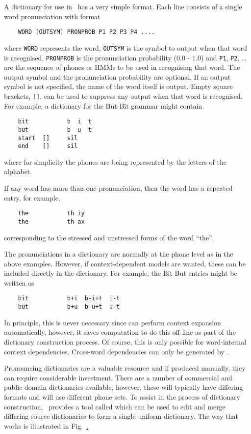A dictionary for use in \HTK\ has a very simple format.
Each line consists of a single word pronunciation with format
\begin{verbatim}
    WORD [OUTSYM] PRONPROB P1 P2 P3 P4 ....
\end{verbatim}
where \texttt{WORD} represents the word, \texttt{OUTSYM} is the symbol to
output when that word is recognised, \texttt{PRONPROB} is the pronunciation
probability ($0.0$ - $1.0$) and \texttt{P1}, \texttt{P2}, \ldots are the
sequence of phones or HMMs to be used in recognising that word. The output
symbol and the pronunciation probability are optional. If an output symbol is
not specified, the name of the word itself is output. Empty square brackets,
\texttt{[]}, can be used to suppress any output when that word is recognised.
For example, a dictionary for the But-Bit grammar might contain
\begin{verbatim}
    bit           b  i  t 
    but           b  u  t
    start  []     sil
    end    []     sil
\end{verbatim}
where for simplicity the phones are being represented by the letters of the alphabet.

If any word has more than one pronunciation, then the word
has a repeated entry, for example,
\begin{verbatim}
    the           th iy
    the           th ax 
\end{verbatim}
corresponding to the stressed and unstressed forms of the word
``the''.

The pronunciations in a dictionary are normally at the phone
level as in the above examples.  However, if context-dependent
models are wanted, these can be included directly in the dictionary.
For example, the Bit-But entries might be written as
\begin{verbatim}
    bit           b+i  b-i+t  i-t 
    but           b+u  b-u+t  u-t
\end{verbatim}
In principle, this is never necessary since  can perform context
expansion automatically, however, it saves computation to do this
off-line as part of the dictionary construction process.  Of course,
this is only possible for word-internal context dependencies.
Cross-word dependencies can only be generated by .


Pronouncing dictionaries are a valuable resource and if produced
manually, they can require considerable investment.  There are
a number of commercial and public domain dictionaries available,
however, these will typically have differing formats and will
use different phone sets.  To assist in the process of
dictionary construction, \HTK\ provides a tool called 
which can be used to edit and merge differing source dictionaries
to form a single uniform dictionary.  The way that
 works is illustrated in Fig.~\href{f:dmaker}.


